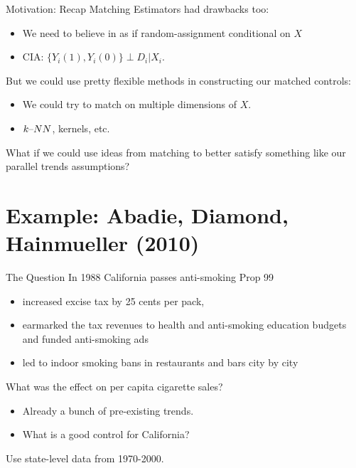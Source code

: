 \documentclass[aspectratio=169,11pt]{beamer}
\begin{document}
\begin{frame}{Motivation: Recap}
Matching Estimators had drawbacks too:
\begin{itemize}
\item We need to believe in as if random-assignment conditional on $X$
\item CIA: $\{Y_i(1), Y_i(0)\} \perp D_i | X_i$.
\end{itemize}
But we could use pretty flexible methods in constructing our matched controls:           
\begin{itemize}
\item We could try to match on multiple dimensions of $X$.
\item $k\text{\textendash}NN$, kernels, etc.
\end{itemize}
What if we could use ideas from \alert{matching} to better satisfy something like our \alert{parallel trends} assumptions?
\end{frame}

\section{Example: Abadie, Diamond, Hainmueller (2010)}

\begin{frame}{The Question}
In 1988 California passes anti-smoking Prop 99
\begin{itemize}
\item increased excise tax by 25 cents per pack, 
\item earmarked the tax revenues to health and anti-smoking education budgets and funded anti-smoking ads
\item led to indoor smoking bans in restaurants and bars city by city
\end{itemize}
 What was the effect on per capita cigarette sales?
 \begin{itemize}
 \item Already a bunch of pre-existing trends.
 \item What is a good control for California?
 \end{itemize}
 Use state-level data from 1970-2000.
\end{frame}
\end{document}
